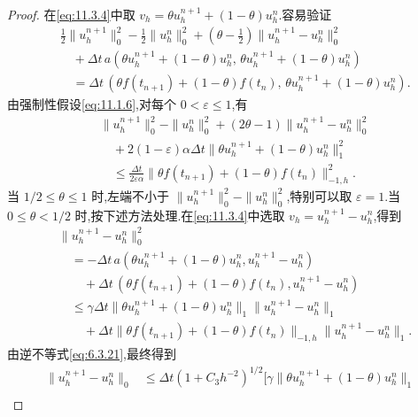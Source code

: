 \begin{proof}
在\eqref{eq:11.3.4}中取 \(v_h=\theta u_h^{n+1}+(1-\theta)u_h^n\).容易验证
\[
  \begin{aligned}
    &\tfrac12\|u_h^{n+1}\|_0^2-\tfrac12\|u_h^n\|_0^2
       +(\theta-\tfrac12)\|u_h^{n+1}-u_h^n\|_0^2\\
    &\quad+\Delta t\,a(\theta u_h^{n+1}+(1-\theta)u_h^n,\,
                        \theta u_h^{n+1}+(1-\theta)u_h^n)\\
    &\quad=\Delta t\,(\theta f(t_{n+1})+(1-\theta)f(t_n),\,
                         \theta u_h^{n+1}+(1-\theta)u_h^n).
  \end{aligned}
\]
由强制性假设\eqref{eq:11.1.6},对每个 \(0<\varepsilon\le1\),有
\begin{equation}\label{eq:11.3.9}
  \begin{aligned}
    &\|u_h^{n+1}\|_0^2-\|u_h^n\|_0^2+(2\theta-1)\|u_h^{n+1}-u_h^n\|_0^2\\
    &\quad+2(1-\varepsilon)\alpha\Delta t\|\theta u_h^{n+1}+(1-\theta)u_h^n\|_1^2\\
    &\quad\le\frac{\Delta t}{2\varepsilon\alpha}
          \|\theta f(t_{n+1})+(1-\theta)f(t_n)\|_{-1,h}^2.
  \end{aligned}
\end{equation}
当 \(1/2\le\theta\le1\) 时,左端不小于 \(\|u_h^{n+1}\|_0^2-\|u_h^n\|_0^2\),特别可以取 \(\varepsilon=1\).当 \(0\le\theta<1/2\) 时,按下述方法处理.在\eqref{eq:11.3.4}中选取 \(v_h=u_h^{n+1}-u_h^n\),得到
\begin{equation}\label{eq:11.3.10}
  \begin{aligned}
    &\|u_h^{n+1}-u_h^n\|_0^2\\
    &\quad=-\Delta t\,a(\theta u_h^{n+1}+(1-\theta)u_h^n,u_h^{n+1}-u_h^n)\\
    &\qquad+\Delta t\,(\theta f(t_{n+1})+(1-\theta)f(t_n),u_h^{n+1}-u_h^n)\\
    &\quad\le\gamma\Delta t\|\theta u_h^{n+1}+(1-\theta)u_h^n\|_1\|u_h^{n+1}-u_h^n\|_1\\
    &\qquad+\Delta t\|\theta f(t_{n+1})+(1-\theta)f(t_n)\|_{-1,h}\|u_h^{n+1}-u_h^n\|_1 .
  \end{aligned}
\end{equation}
由逆不等式\eqref{eq:6.3.21},最终得到
\begin{equation}\label{eq:11.3.11}
  \begin{aligned}
    \|u_h^{n+1}-u_h^n\|_0
      &\le\Delta t(1+C_3h^{-2})^{1/2}
          \bigl[\gamma\|\theta u_h^{n+1}+(1-\theta)u_h^n\|_1\\

\end{aligned}
\end{equation}
\end{proof}
